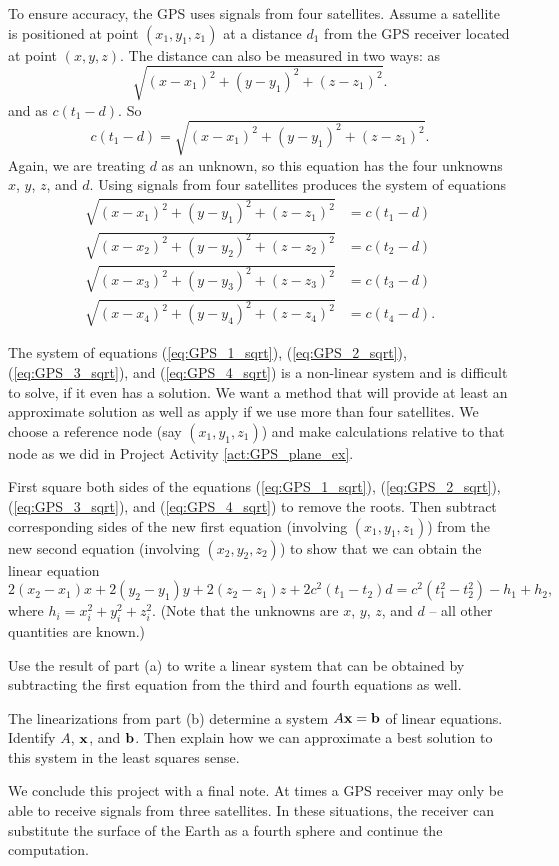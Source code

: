 To ensure accuracy, the GPS uses signals from four satellites. Assume a satellite is positioned at point $(x_1,y_1,z_1)$ at a distance $d_1$ from the GPS receiver located at point $(x,y,z)$. The distance can also be measured in two ways: as 
\[\sqrt{(x-x_1)^2+(y-y_1)^2+(z-z_1)^2}.\]
and as $c(t_1-d)$. So 
\[c(t_1-d) = \sqrt{(x-x_1)^2 + (y-y_1)^2 + (z-z_1)^2}.\]
Again, we are treating $d$ as an unknown, so this equation has the four unknowns $x$, $y$, $z$, and $d$. Using signals from four satellites produces the system of equations
\begin{align}
\sqrt{(x-x_1)^2 + (y-y_1)^2 + (z-z_1)^2} &=  c(t_1-d)  \label{eq:GPS_1_sqrt} \\
\sqrt{(x-x_2)^2 + (y-y_2)^2 + (z-z_2)^2}  &=  c(t_2-d)  \label{eq:GPS_2_sqrt} \\
\sqrt{(x-x_3)^2 + (y-y_3)^2 + (z-z_3)^2} &=  c(t_3-d)  \label{eq:GPS_3_sqrt} \\
\sqrt{(x-x_4)^2 + (y-y_4)^2 + (z-z_4)^2} &=  c(t_4-d). \label{eq:GPS_4_sqrt}
\end{align}


\begin{pactivity} \label{act:GPS_3D} The system of equations (\ref{eq:GPS_1_sqrt}), (\ref{eq:GPS_2_sqrt}), (\ref{eq:GPS_3_sqrt}), and (\ref{eq:GPS_4_sqrt}) is a non-linear system and is difficult to solve, if it even has a solution. We want a method that will provide at least an approximate solution as well as apply if we use more than four satellites. We choose a reference node (say $(x_1, y_1, z_1)$) and make calculations relative to that node as we did in Project Activity \ref{act:GPS_plane_ex}.
\ba
\item First square both sides of the equations (\ref{eq:GPS_1_sqrt}), (\ref{eq:GPS_2_sqrt}), (\ref{eq:GPS_3_sqrt}), and (\ref{eq:GPS_4_sqrt}) to remove the roots. Then subtract corresponding sides of the new first equation (involving $(x_1,y_1,z_1)$) from the new second equation  (involving $(x_2,y_2,z_2)$) to show that we can obtain the linear equation 
\[2(x_2-x_1)x + 2(y_2-y_1)y + 2(z_2-z_1)z + 2c^2(t_1-t_2)d = c^2(t_1^2-t_2^2)  - h_1 +h_2,\]
where $h_i = x_i^2 + y_i^2 + z_i^2$. (Note that the unknowns are $x$, $y$, $z$, and $d$ -- all other quantities are known.)

\item Use the result of part (a) to write a linear system that can be obtained by subtracting the first equation from the third and fourth equations as well. 

\item The linearizations from part (b) determine a system $A \mathbf{x} = \mathbf{b}$ of linear equations. Identify $A$, $\mathbf{x}$, and $\mathbf{b}$. Then explain how we can approximate a best solution to this system in the least squares sense. 

\ea

\end{pactivity}

We conclude this project with a final note. At times a GPS receiver may only be able to receive signals from three satellites. In these situations, the receiver can substitute the surface of the Earth as a fourth sphere and continue the computation. 	



